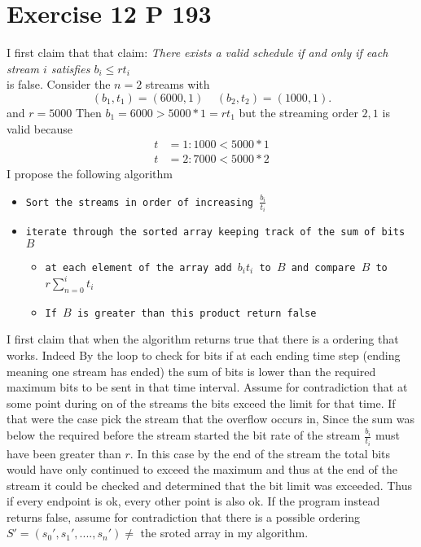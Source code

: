 \documentclass{amsart}
\begin{document}
\section{Exercise 12 P 193}
I first claim that that claim:
\emph{
    There exists a valid schedule if and only if each stream $i$ satisfies $b_i \le rt_i$
}\\
is false.
Consider the $n=2$ streams with
\[
    (b_1,t_1) = (6000,1) \;\;\;\; (b_2,t_2) = (1000,1)
.\] 
and $r = 5000$
Then $b_1 = 6000  > 5000 * 1 = rt_1$ but the streaming order $2,1$ is valid because
\begin{align*}
    t &= 1: 1000 < 5000 * 1\\
    t &= 2: 7000 < 5000 * 2
\end{align*}
I propose the following algorithm
{\small
    \begin{itemize}
        \item \texttt{Sort the streams in order of increasing $\frac{b_i}{t_i}$}
        \item \texttt{iterate through the sorted array keeping track of the sum of bits $B$}
            \begin{itemize}
                \item \texttt{at each element of the array add $b_it_i$ to  $B$ and compare $B$ to $r\sum_{n=0}^{i}t_i$ }
                \item \texttt{If $B$ is greater than this product return false}
            \end{itemize}
    \end{itemize}
}
I first claim that when the algorithm returns true that there is a ordering that works.
Indeed By the loop to check for bits if at each ending time step (ending meaning one stream has ended)
the sum of bits is lower than the required maximum bits to be sent in that time interval. Assume for contradiction that
at some point during on of the streams the bits exceed the limit for that time. If that were the case pick the stream that the
overflow occurs in, Since the sum was below the required before the stream started the bit rate of the stream $\frac{b_i}{t_i}$ must have been greater 
than $r$. In this case by the end of the stream the total bits would have only continued to exceed the maximum and thus at the end of the stream it could be checked and determined
that the bit limit was exceeded. Thus if every endpoint is ok, every other point is also ok.
If the program instead returns false, assume for contradiction that there is a possible ordering
$S' = (s_0',s_1',....,s_n') \ne $  the sroted array in my algorithm.
\end{document}
